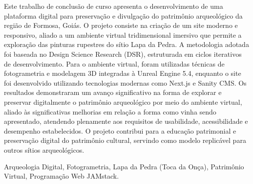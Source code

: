Este trabalho de conclusão de curso apresenta o desenvolvimento de uma plataforma digital para preservação e divulgação do patrimônio arqueológico da região de Formosa, Goiás. O projeto consiste na criação de um site moderno e responsivo, aliado a um ambiente virtual tridimensional imersivo que permite a exploração das pinturas rupestres do sítio Lapa da Pedra. A metodologia adotada foi baseada no Design Science Research (DSR), estruturada em ciclos iterativos de desenvolvimento. Para o ambiente virtual, foram utilizadas técnicas de fotogrametria e modelagem 3D integradas à Unreal Engine 5.4, enquanto o site foi desenvolvido utilizando tecnologias modernas como Next.js e Sanity CMS. Os resultados demonstraram um avanço significativo na forma de explorar e preservar digitalmente o patrimônio arqueológico por meio do ambiente virtual, aliado às significativas melhorias em relação a forma como vinha sendo apresentado, atendendo plenamente aos requisitos de usabilidade, acessibilidade e desempenho estabelecidos. O projeto contribui para a educação patrimonial e preservação digital do patrimônio cultural, servindo como modelo replicável para outros sítios arqueológicos.

\begin{keywords}
Arqueologia Digital, Fotogrametria, Lapa da Pedra (Toca da Onça), Patrimônio Virtual, Programação Web JAMstack.
\end{keywords}



